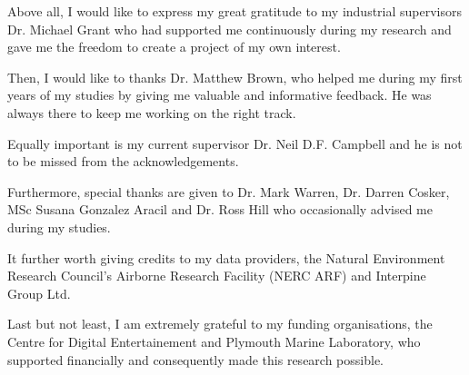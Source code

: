 \documentclass{subfiles}
\begin{document}
	\par Above all, I would like to express my great gratitude to my industrial supervisors Dr. Michael Grant who had supported me continuously during my research and gave me the freedom to create a project of my own interest.
	
	\par Then, I would like to thanks Dr. Matthew Brown, who helped me during my first years of my studies by giving me valuable and informative feedback. He was always there to keep me working on the right track. 
	
	\par Equally important is my current supervisor Dr. Neil D.F. Campbell and he is not to be missed from the acknowledgements.
	
	\par Furthermore, special thanks are given to Dr. Mark Warren, Dr. Darren Cosker, MSc Susana Gonzalez Aracil and Dr. Ross Hill who occasionally advised me during my studies. 
	
	\par It further worth giving credits to my data providers, the Natural Environment Research Council’s Airborne Research Facility (NERC ARF) and Interpine Group Ltd. 
	
	\par Last but not least, I am extremely grateful to my funding organisations, the Centre for Digital Entertainement and Plymouth Marine Laboratory, who supported financially and consequently made this research possible. 
	

	
\end{document}

